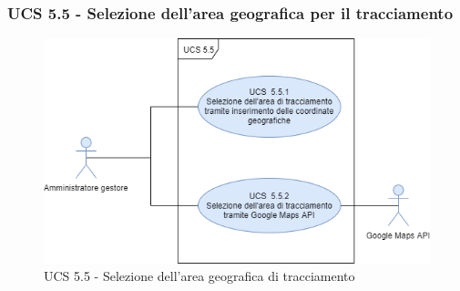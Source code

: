 \subsubsection{UCS 5.5 - Selezione dell'area geografica per il tracciamento}%
\begin{figure}[h]
	\centering
    \includegraphics[scale=0.53]{Sezioni/UseCase/Immagini/UCS5.5.png}
    \caption{UCS 5.5 - Selezione dell'area geografica di tracciamento}
\end{figure}
